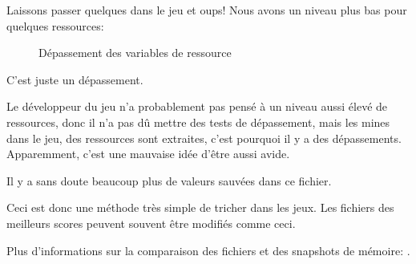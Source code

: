 \clearpage
Laissons passer quelques  dans le jeu et oups!
Nous avons un niveau plus bas pour quelques ressources:

\begin{figure}[H]
\centering
{}
\caption{Dépassement des variables de ressource}
\label{fig:mill_8}
\end{figure}

C'est juste un dépassement.

Le développeur du jeu n'a probablement pas pensé à un niveau aussi élevé de ressources,
donc il n'a pas dû mettre des tests de dépassement, mais les mines 
dans le jeu, des ressources sont extraites, c'est pourquoi il y a des dépassements.
Apparemment, c'est une mauvaise idée d'être aussi avide.

Il y a sans doute beaucoup plus de valeurs sauvées dans ce fichier.

Ceci est donc une méthode très simple de tricher dans les jeux.
Les fichiers des meilleurs scores peuvent souvent être modifiés comme ceci.

Plus d'informations sur la comparaison des fichiers et des snapshots de mémoire:
.
